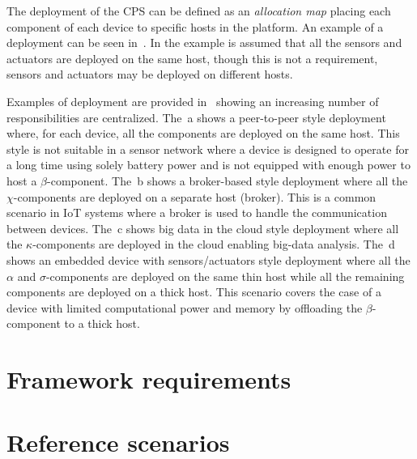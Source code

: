 The deployment of the CPS can be defined as an \emph{allocation map} placing each component of each device to specific hosts in the platform.
An example of a deployment can be seen in~. In the example is assumed that all the sensors and actuators are deployed on the
same host, though this is not a requirement, sensors and actuators may be deployed on different hosts.

Examples of deployment are provided in~ showing an increasing number of responsibilities are centralized.
The~a shows a peer-to-peer style deployment where, for each device, all the components are deployed on the same host.
This style is not suitable in a sensor network where a device is designed to operate for a long time using solely battery power and is not equipped
with enough power to host a $\beta$-component.
The~b shows a broker-based style deployment where all the $\chi$-components are deployed on a separate host (broker).
This is a common scenario in IoT systems where a broker is used to handle the communication between devices.
The~c shows big data in the cloud style deployment where all the $\kappa$-components are deployed in the cloud
enabling big-data analysis.
The~d shows an embedded device with sensors/actuators style deployment where all the $\alpha$ and $\sigma$-components
are deployed on the same thin host while all the remaining components are deployed on a thick host. This scenario covers the case of a device
with limited computational power and memory by offloading the $\beta$-component to a thick host.


\section{Framework requirements}
\label{sec:framework-requirements}


\section{Reference scenarios}
\label{sec:reference-scenarios}
